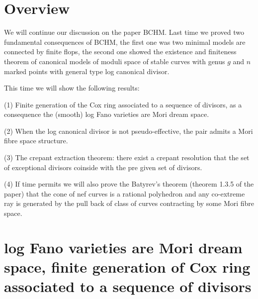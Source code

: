 \documentclass[11pt]{article}
\theoremstyle{definition}
\begin{document}
	\section{Overview}
	We will continue our discussion on the paper BCHM. Last time we proved two fundamental consequences of BCHM, the first one was two minimal models are connected by finite flops, the second one showed the existence and finiteness theorem of canonical models of moduli space of stable curves with genus $g$ and $n$ marked points with general type log canonical divisor.
	
	This time we will show the following results:
	
	(1) Finite generation of the Cox ring associated to a sequence of divisors, as a consequence the (smooth) log Fano varieties are Mori dream space.
	
	(2) When the log canonical divisor is not pseudo-effective, the pair admits a Mori fibre space structure.
	
	(3) The crepant extraction theorem: there exist a crepant resolution that the set of exceptional divisors coinside with the pre given set of divisors.
	
	(4) If time permits we will also prove the Batyrev’s theorem (theorem 1.3.5 of the paper) that the cone of nef curves is a rational polyhedron and any co-extreme ray is generated by the pull back of class of curves contracting by some Mori fibre space.
	
	\section{log Fano varieties are Mori dream space, finite generation of Cox ring associated to a sequence of divisors}
	
	\printbibliography
\end{document}
